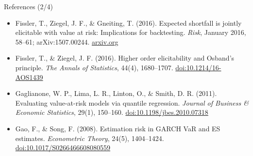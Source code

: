 \begin{frame}{References (2/4)}
\begin{itemize}
    \item Fissler, T., Ziegel, J. F., \& Gneiting, T. (2016). Expected shortfall is jointly elicitable with value at risk: Implications for backtesting. \textit{Risk}, January 2016, 58--61; arXiv:1507.00244. \href{https://arxiv.org/abs/1507.00244}{arxiv.org}
    \item Fissler, T., \& Ziegel, J. F. (2016). Higher order elicitability and Osband's principle. \textit{The Annals of Statistics}, 44(4), 1680--1707. \href{https://doi.org/10.1214/16-AOS1439}{doi:10.1214/16-AOS1439}
    \item Gaglianone, W. P., Lima, L. R., Linton, O., \& Smith, D. R. (2011). Evaluating value-at-risk models via quantile regression. \textit{Journal of Business \& Economic Statistics}, 29(1), 150--160. \href{https://doi.org/10.1198/jbes.2010.07318}{doi:10.1198/jbes.2010.07318}
    \item Gao, F., \& Song, F. (2008). Estimation risk in GARCH VaR and ES estimates. \textit{Econometric Theory}, 24(5), 1404--1424. \href{https://doi.org/10.1017/S0266466608080559}{doi:10.1017/S0266466608080559}
\end{itemize}
\end{frame}

